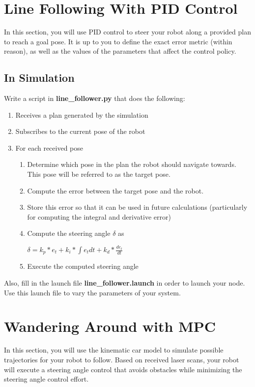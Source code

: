 \documentclass[final]{article}
\begin{document}
\section{Line Following With PID Control}
In this section, you will use PID control to steer your robot along a provided plan to reach a goal  pose. It is up to you to define the exact error metric (within reason), as well as the values of the parameters that affect the control policy.

\subsection{In Simulation}
Write a script in \textbf{line\_follower.py} that does the following:

\begin{enumerate}
\item Receives a plan generated by the simulation
\item Subscribes to the current pose of the robot
\item For each received pose
 \begin{enumerate}
 \item Determine which pose in the plan the robot should navigate towards. This pose will be referred to as the target pose.
 \item Compute the error between the target pose and the robot.
 \item Store this error so that it can be used in future calculations (particularly for computing the integral and derivative error)
 \item Compute the steering angle $\delta$ as \\
 
  \centerline{$\delta = k_p*e_t + k_i* \int e_t dt + k_d* \frac{de_t}{dt}$}
 
 \item Execute the computed steering angle
 \end{enumerate}
\end{enumerate}

Also, fill in the launch file \textbf{line\_follower.launch} in order to launch your node. Use this launch file to vary the parameters of your system.

\section{Wandering Around with MPC}

In this section, you will use the kinematic car model to simulate possible trajectories for your robot to follow. Based on received laser scans, your robot will execute a steering angle control that avoids obstacles while minimizing the steering angle control effort.
\end{document}
